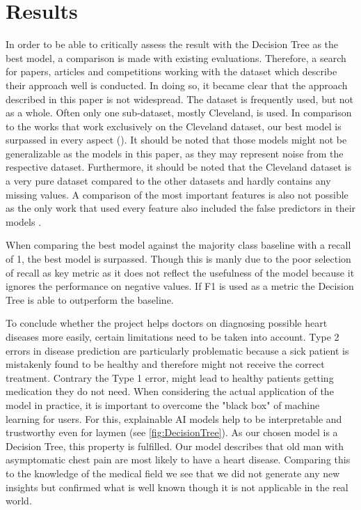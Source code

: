 
\section{Results} \label{sec:results}

In order to be able to critically assess the result with the Decision Tree as the best model, a comparison is made with existing evaluations. Therefore, a search for papers, articles and competitions working with the dataset which describe their approach well is conducted. In doing so,  it became clear that the approach described in this paper is not widespread. The dataset is frequently used, but not as a whole. Often only one sub-dataset, mostly Cleveland, is used.  In comparison to the works that work exclusively on the Cleveland dataset, our best model is surpassed in every aspect (\cite{ayatollahi2019,alotaibi2019, uyar2017}). It should be noted that those models might not be generalizable as the models in this paper, as they may represent noise from the respective dataset. Furthermore, it should be noted that the Cleveland dataset is a very pure dataset compared to the other datasets and hardly contains any missing values. 
A comparison of the most important features is also not possible as the only work that used every feature also included the false predictors in their models \cite{garate-escamila2020}.

When comparing the best model against the majority class baseline with a recall of 1, the best model is surpassed. Though this is manly due to the poor selection of recall as key metric as it does not reflect the usefulness of the model because it ignores the performance on negative values. If F1 is used as a metric the Decision Tree is able to outperform the baseline.

To conclude whether the project helps doctors on diagnosing possible heart diseases more easily, certain limitations need to be taken into account. Type 2 errors in disease prediction are particularly problematic because a sick patient is mistakenly found to be healthy and therefore might not receive the correct treatment. Contrary the Type 1 error, might lead to healthy patients getting medication they do not need. When considering the actual application of the model in practice, it is important to overcome the "black box" of machine learning for users. For this, explainable AI models help to be interpretable and trustworthy even for laymen (see \cref{fig:DecisionTree}). As our chosen model is a Decision Tree, this property is fulfilled. Our model describes that old man with asymptomatic chest pain are most likely to have a heart disease. Comparing this to the knowledge of the medical field \citep{rodgers2019} we see that we did not generate any new insights but confirmed what is well known though it is not applicable in the real world.
